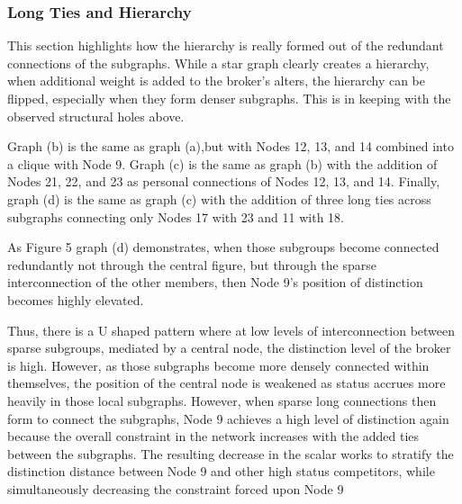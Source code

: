 \documentclass[12pt]{article}
\begin{document}
\subsubsection{Long Ties and Hierarchy}
This section highlights how the hierarchy is really formed out of the redundant connections of the subgraphs. While a star graph clearly creates a hierarchy, when additional weight is added to the broker's alters, the hierarchy can be flipped, especially when they form denser subgraphs. This is in keeping with the observed structural holes above. 

Graph (b) is the same as graph (a),but with Nodes 12, 13, and 14 combined into a clique with Node 9. Graph (c) is the same as graph (b) with the addition of Nodes 21, 22, and 23 as personal connections of Nodes 12, 13, and 14. Finally, graph (d) is the same as graph (c) with the addition of three long ties across subgraphs connecting only Nodes 17 with 23 and 11 with 18.

As Figure 5 graph (d) demonstrates, when those subgroups become connected redundantly not through the central figure, but through the sparse interconnection of the other members, then Node 9's position of distinction becomes highly elevated.

Thus, there is a U shaped pattern where at low levels of interconnection between sparse subgroups, mediated by a central node, the distinction level of the broker is high. However, as those subgraphs become more densely connected within themselves, the position of the central node is weakened as status accrues more heavily in those local subgraphs. However, when sparse long connections then form to connect the subgraphs, Node 9 achieves a high level of distinction again because the overall constraint in the network increases with the added ties between the subgraphs. The resulting decrease in the scalar works to stratify the distinction distance between Node 9 and other high status competitors, while simultaneously decreasing the constraint forced upon Node 9 
\end{document}
